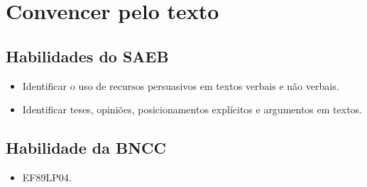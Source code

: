 \chapter{Convencer pelo texto}



\section{Habilidades do SAEB}

\begin{itemize}
\item
  Identificar o uso de recursos persuasivos em textos verbais e não
  verbais.
\item
  Identificar teses, opiniões, posicionamentos explícitos e argumentos
  em textos.
\end{itemize}

\section{Habilidade da BNCC}

\begin{itemize}
\item EF89LP04.
\end{itemize}




